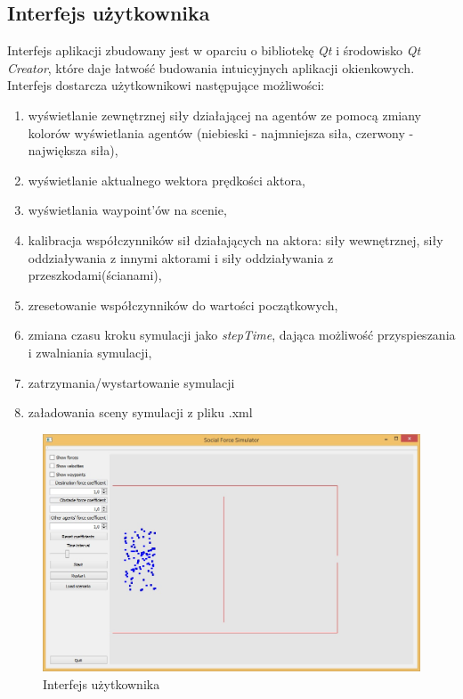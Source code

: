 \subsection{Interfejs użytkownika}
\hspace{4ex}Interfejs aplikacji zbudowany jest w oparciu o bibliotekę \emph{Qt} i środowisko \emph{Qt Creator}, które daje łatwość budowania intuicyjnych aplikacji okienkowych. Interfejs dostarcza użytkownikowi następujące możliwości:
\begin{enumerate}
\item wyświetlanie zewnętrznej siły działającej na agentów ze pomocą zmiany kolorów wyświetlania agentów (niebieski - najmniejsza siła, czerwony - największa siła),
\item wyświetlanie aktualnego wektora prędkości aktora,
\item wyświetlania waypoint'ów na scenie,
\item kalibracja współczynników sił działających na aktora: siły wewnętrznej, siły oddziaływania z innymi aktorami i siły oddziaływania z przeszkodami(ścianami),
\item zresetowanie współczynników do wartości początkowych,
\item zmiana czasu kroku symulacji jako \emph{stepTime}, dająca możliwość przyspieszania i zwalniania symulacji,
\item zatrzymania/wystartowanie symulacji
\item załadowania sceny symulacji z pliku .xml
\end{enumerate}

\begin{figure}[ht]
\centering
\includegraphics[scale=0.5]{ui}
\caption{Interfejs użytkownika}
\end{figure}

